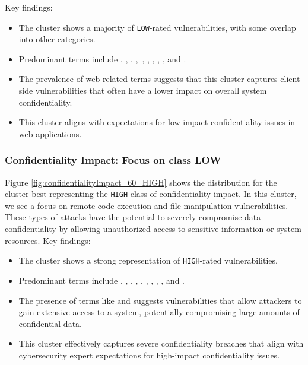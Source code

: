 Key findings:

\begin{itemize}
	\item The cluster shows a majority of \texttt{LOW}-rated vulnerabilities, with some overlap into other categories.
	\item Predominant terms include , , , ,\ , , , , , and .
	\item The prevalence of web-related terms suggests that this cluster captures client-side vulnerabilities that often have a lower impact on overall system confidentiality.
	\item This cluster aligns with expectations for low-impact confidentiality issues in web applications.
\end{itemize}


\subsubsection{Confidentiality Impact: Focus on class LOW}

Figure \ref{fig:confidentialityImpact_60_HIGH} shows the distribution for the cluster best representing the \texttt{HIGH} class of confidentiality impact. In this cluster, we see a focus on remote code execution and file manipulation vulnerabilities. These types of attacks have the potential to severely compromise data confidentiality by allowing unauthorized access to sensitive information or system resources. Key findings:

\begin{itemize}
	\item The cluster shows a strong representation of \texttt{HIGH}-rated vulnerabilities.
	\item Predominant terms include , , , , , , , , , and .
	\item The presence of terms like  and  suggests vulnerabilities that allow attackers to gain extensive access to a system, potentially compromising large amounts of confidential data.
	\item This cluster effectively captures severe confidentiality breaches that align with cybersecurity expert expectations for high-impact confidentiality issues.
\end{itemize}

